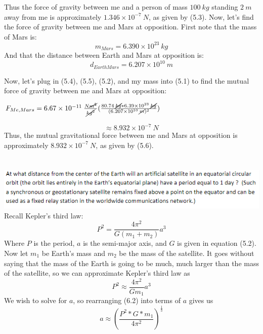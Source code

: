 \documentclass{article}
\begin{document}
Thus the force of gravity between me and a person of mass $100\: kg$ standing $2\:m$ away from me is approximately $1.346\times10^{-7}\:N$, as given by (5.3).
\newline\newline
Now, let's find the force of gravity between me and Mars at opposition.
First note that the mass of Mars is:
\begin{equation}
    m_{Mars} = 6.390\times10^{23}\:kg
\end{equation}
And that the distance between Earth and Mars at opposition is:
\begin{equation}
    d_{Earth Mars} = 6.207\times10^{10}\:m
\end{equation}

Now, let's plug in (5.4), (5.5), (5.2), and my mass into (5.1) to find the mutual force of gravity between me and Mars at opposition:
\begin{center}
    $F_{Me, Mars} = 6.67\times10^{-11}\:\frac{N\cancel{m^2}}{\cancel{kg^2}}(\frac{80.74\:\cancel{kg}*6.39\times10^{23}\:\cancel{kg}}{(6.207\times10^{10}\:\cancel{m})^2})$
\end{center}
\begin{equation}
     \approx 8.932\times10^{-7}\:N
\end{equation}
Thus, the mutual gravitational force between me and Mars at opposition is approximately $8.932\times10^{-7}\:N$, as given by (5.6).

\section{}
\includegraphics[scale = 0.8]{problemset1q6.PNG}
\newline\newline
Recall Kepler's third law:
\begin{equation}
    P^2 = \frac{4\pi^2}{G(m_1+m_2)}a^3
\end{equation}
Where $P$ is the period, $a$ is the semi-major axis, and $G$ is given in equation (5.2).
\newline
Now let $m_1$ be Earth's mass and $m_2$ be the mass of the satellite. It goes without saying that the mass of the Earth is going to be much, much larger than the mass of the satellite, so we can approximate Kepler's third law as
\begin{equation}
    P^2 \approx \frac{4\pi^2}{Gm_1}a^3
\end{equation}
We wish to solve for $a$, so rearranging (6.2) into terms of $a$ gives us
\begin{equation}
    a \approx (\frac{P^2*G*m_1}{4\pi^2})^{\frac{1}{3}}
\end{equation}
\end{document}
